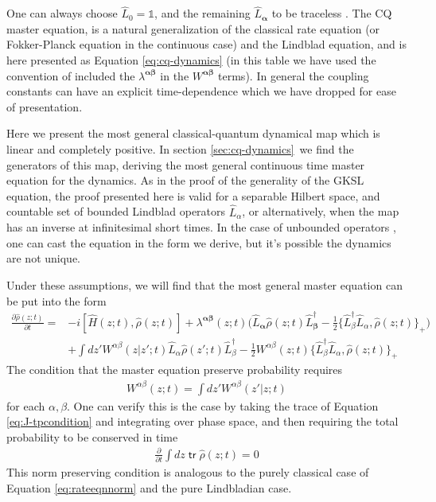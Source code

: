 \documentclass[aps,pra,showpacs,citeautoscript,amsmath,amssymb,floatfix,superscriptaddress,bbm, verbatim,amsfonts,changes,11pt,nofootinbib,longbibliography]{revtex4-2}
\newcommand{\id}{\mathbb{1}}
\newcommand{\tr}{\mathop{\mathsf{tr}}\nolimits}
\newcommand{\ag}{{\boldsymbol\alpha}}
\newcommand{\bg}{{\boldsymbol\beta}}
\def\z{{z}}
\def\L{{\hat{L}}}
\def\Hq{\hat{H}}
\def\dz{{d\z}}
\def\rate{{W}}
\def\linrate{{\lambda}}
\renewcommand{\varrho}{\hat{\rho}}
\def\psiz{{\varrho(\z;t)}}
\def\psizt{{\varrho(\z;t)}}
\def\psizp{{\varrho(\z';t)}}
\begin{document}
\begin{table}
\begin{center}
{				One can always choose $\L_0=\id$, and the remaining $\L_\ag$ to be traceless \cite{UCLPawula}.
				The CQ master equation, is a natural generalization of the classical rate equation (or Fokker-Planck equation in the continuous case) and the Lindblad equation, and is here presented as Equation \eqref{eq:cq-dynamics} (in this table we have used the convention of included the $\lambda^{\ag\bg}$ in the $\rate^{\ag\bg}$ terms). In general the coupling constants can have an explicit time-dependence which we have dropped for ease of presentation.}
		\endgroup
	\end{center}
\end{table}

Here we present the most general classical-quantum dynamical map which is linear and completely positive. In section \ref{sec:cq-dynamics}\ we find the generators of this map, deriving the most general continuous time master equation for the dynamics. As in the proof of the generality of the GKSL equation, the proof presented here is valid for a separable Hilbert space, and countable set of bounded Lindblad operators $\L_\alpha$, or alternatively, when the map has an inverse at infinitesimal short times.
In the case of unbounded operators \cite{siemon2017unbounded}, one can cast the equation in the form we derive, but it's possible the dynamics are not unique. %

Under these assumptions, we will find that the most general master equation can be put into the form
\begin{align}
  \frac{\partial\psiz}{\partial t}
  =&-i[\Hq(\z;t),\psiz]+
 \linrate^{\ag\bg}(\z;t)\Big(
\L_{\ag}\psizt \L_{\bg}^\dagger
  -
  \frac{1}{2}\{\L_\beta^\dagger\L_\alpha,\psiz\}_+
  \Big)
  \nonumber\\
&+
 \int d\z' 
 \rate^{\alpha\beta}(\z|\z';t)
  \L_{\alpha}\psizp\L_{\beta}^\dagger  
-\frac{1}{2}\rate^{\alpha\beta}(\z;t)\{\L_\beta^\dagger\L_\alpha,\psiz\}_+
      \label{eq:cq-dynamics}
\end{align}
The condition that the master equation preserve probability requires
\begin{align}
\rate^{\alpha\beta}(\z;t)=\int \dz' \rate^{\alpha\beta}(\z'|\z;t)
\label{eq:J-tpcondition}
\end{align}
for each $\alpha,\beta$.
One can verify this is the case by  taking the trace of Equation \eqref{eq:J-tpcondition} and integrating over phase space, and then requiring the total probability to be conserved in time
\begin{align}
\frac{\partial}{\partial t}\int d\z\tr\psiz=0
\label{eq:tp-intime}
\end{align}
This norm preserving condition is analogous to the purely classical case of Equation \eqref{eq:rateeqnnorm} and the pure Lindbladian case.
\end{document}
